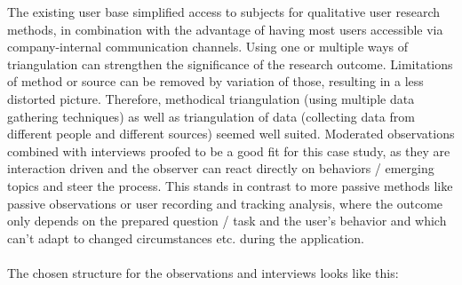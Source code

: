 The existing user base simplified access to subjects for qualitative user research methods, in combination with the advantage of having most users accessible via company-internal communication channels.
Using one or multiple ways of triangulation \cite[p. 264]{Interactiondesign:2019ys} can strengthen the significance of the research outcome. Limitations of method or source can be removed by variation of those, resulting in a less distorted picture.
Therefore, methodical triangulation (using multiple data gathering techniques) as well as triangulation of data (collecting data from different people and different sources) seemed well suited.
Moderated observations combined with interviews proofed to be a good fit for this case study, as they are interaction driven and the observer can react directly on behaviors / emerging topics and steer the process.
This stands in contrast to more passive methods like passive observations or user recording and tracking analysis, where the outcome only depends on the
prepared question / task and the user's behavior and which can't adapt to changed circumstances etc. during the application.
\\\\
The chosen structure for the observations and interviews looks like this:

